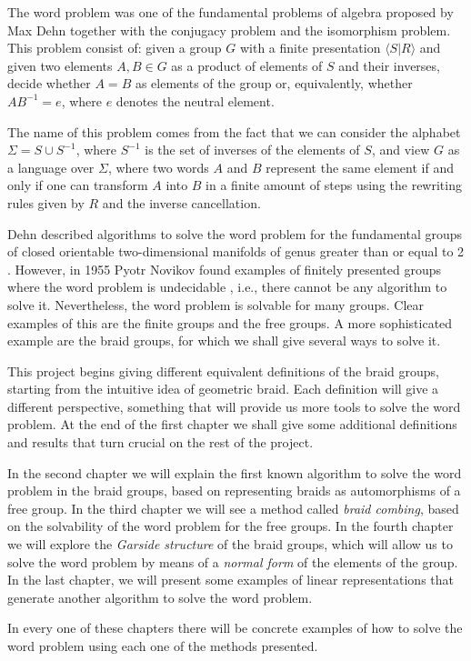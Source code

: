 \documentclass[TFG.tex]{subfiles}
\begin{document}

The word problem was one of the fundamental problems of algebra proposed by Max Dehn \cite{Dehn11} together with the conjugacy problem and the isomorphism problem. This problem consist of: given a group $G$ with a finite presentation $\langle S|R\rangle$ and given two elements $A,B\in G$ as a product of elements of $S$ and their inverses, decide whether $A=B$ as elements of the group or, equivalently, whether $AB^{-1}=e$, where $e$ denotes the neutral element. 

The name of this problem comes from the fact that we can consider the alphabet $\Sigma=S\cup S^{-1}$, where $S^{-1}$ is the set of inverses of the elements of $S$, and view $G$ as a language over $\Sigma$, where two words $A$ and $B$ represent the same element if and only if one can transform $A$ into $B$ in a finite amount of steps using the rewriting rules given by $R$ and the inverse cancellation. 

Dehn described algorithms to solve the word problem for the fundamental groups of closed orientable two-dimensional manifolds of genus greater than or equal to 2 \cite{Dehn12}. However, in 1955 Pyotr Novikov found examples of finitely presented groups where the word problem is undecidable \cite{Novikov}, i.e., there cannot be any algorithm to solve it. Nevertheless, the word problem is solvable for many groups. Clear examples of this are the finite groups and the free groups. A more sophisticated example are the braid groups, for which we shall give several ways to solve it. 

This project begins giving different equivalent definitions of the braid groups, starting from the intuitive idea of geometric braid. Each definition will give a different perspective, something that will provide us more tools to solve the word problem. At the end of the first chapter we shall give some additional definitions and results that turn crucial on the rest of the project.

In the second chapter we will explain the first known algorithm to solve the word problem in the braid groups, based on representing braids as automorphisms of a free group. In the third chapter we will see a method called \emph{braid combing}, based on the solvability of the word problem for the free groups. In the fourth chapter we will explore the \emph{Garside structure} of the braid groups, which will allow us to solve the word problem by means of a \emph{normal form} of the elements of the group. In the last chapter, we will present some examples of linear representations that generate another algorithm to solve the word problem. 

In every one of these chapters there will be concrete examples of how to solve the word problem using each one of the methods presented.
\end{document}
